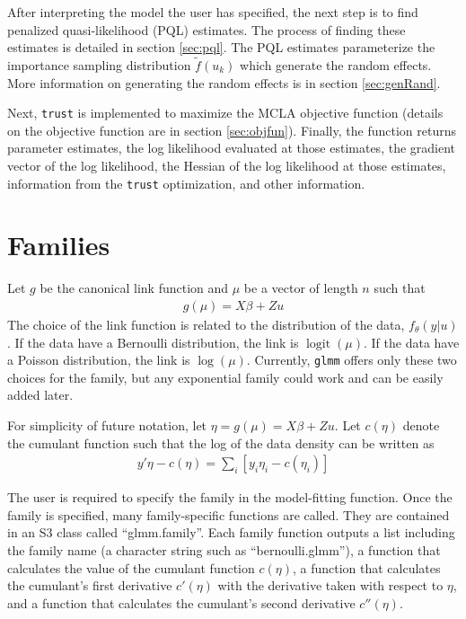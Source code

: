 \documentclass{article}
\DeclareMathOperator{\logit}{logit}
\begin{document}
  After interpreting the model the user has specified, the next step is to find penalized quasi-likelihood (PQL) estimates.  The process of finding these estimates is detailed in section \ref{sec:pql}. The PQL estimates parameterize the importance sampling distribution $\tilde{f}(u_k)$ which generate the random effects.  More information on generating the random effects is in section \ref{sec:genRand}. 

Next, \texttt{trust} is implemented to maximize  the MCLA objective function (details on the objective function are in section \ref{sec:objfun}). Finally, the function  returns parameter estimates, the log likelihood evaluated at those estimates, the gradient vector of the log likelihood,  the Hessian of the log likelihood at those estimates, information from the \texttt{trust} optimization, and other information.


\section{Families} \label{sec:fam}


Let $g$ be the canonical link function and $\mu$ be a vector of length $n$ such that
\begin{align}
g(\mu) = X \beta + Z u
\end{align}
The choice of the link function is related to the distribution of the data, $ f_\theta(y|u)$. If the data have a  Bernoulli distribution, the link is $\logit(\mu)$. If the data have a Poisson distribution, the link is $\log (\mu)$. Currently, \texttt{glmm} offers only these two choices for the family, but any exponential family could work and can be easily added later.

 For simplicity of future notation, let $\eta=g(\mu)=X \beta + Z u$. Let $c(\eta)$ denote the cumulant function such that the log of the data density can be written as
\begin{align}
y' \eta - c(\eta) = \sum_i \left[ y_i \eta_i - c(\eta_i)  \right]
\end{align}

The user is required to specify the family in the model-fitting function. Once the family is specified, many family-specific functions are called. They are contained in an S3 class called ``glmm.family''. Each family function outputs a list including the family name (a character string such as ``bernoulli.glmm''), a function that calculates the value of the cumulant function $c(\eta)$,  a function that calculates the cumulant's first derivative $c'(\eta)$ with the derivative taken with respect to $\eta$, and  a function that calculates the cumulant's second derivative $c''(\eta)$. 
\end{document}
